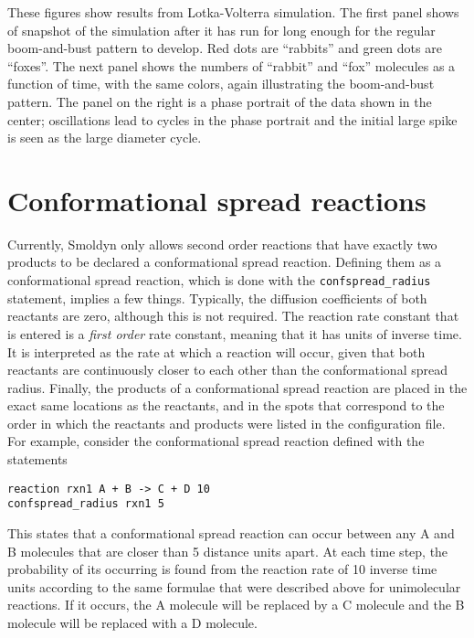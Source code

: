 \documentclass {scrbook}
\newcommand {\ttt} {\texttt}
\begin{document}
These figures show results from Lotka-Volterra simulation. The first panel shows of snapshot of the simulation after it has run for long enough for the regular boom-and-bust pattern to develop. Red dots are ``rabbits'' and green dots are ``foxes''. The next panel shows the numbers of ``rabbit'' and ``fox'' molecules as a function of time, with the same colors, again illustrating the boom-and-bust pattern. The panel on the right is a phase portrait of the data shown in the center; oscillations lead to cycles in the phase portrait and the initial large spike is seen as the large diameter cycle.

\section{Conformational spread reactions}

Currently, Smoldyn only allows second order reactions that have exactly two products to be declared a conformational spread reaction. Defining them as a conformational spread reaction, which is done with the \ttt{confspread\_radius} statement, implies a few things. Typically, the diffusion coefficients of both reactants are zero, although this is not required. The reaction rate constant that is entered is a \textit{first order} rate constant, meaning that it has units of inverse time. It is interpreted as the rate at which a reaction will occur, given that both reactants are continuously closer to each other than the conformational spread radius. Finally, the products of a conformational spread reaction are placed in the exact same locations as the reactants, and in the spots that correspond to the order in which the reactants and products were listed in the configuration file. For example, consider the conformational spread reaction defined with the statements
\begin{lstlisting}[style=SSAC]
reaction rxn1 A + B -> C + D 10
confspread_radius rxn1 5
\end{lstlisting}
This states that a conformational spread reaction can occur between any A and B molecules that are closer than 5 distance units apart. At each time step, the probability of its occurring is found from the reaction rate of 10 inverse time units according to the same formulae that were described above for unimolecular reactions. If it occurs, the A molecule will be replaced by a C molecule and the B molecule will be replaced with a D molecule.
\end{document}
